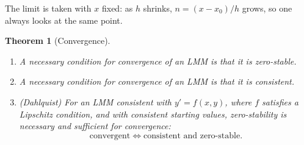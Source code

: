 \documentclass[11pt,a4paper]{article}
\numberwithin{equation}{section}
\theoremstyle{spacedplain}
\newtheorem{theorem}{Theorem}[section]
\theoremstyle{spaceddefinition}
\theoremstyle{spacedremark}
\begin{document}
The limit is taken with \(x\) fixed: as \(h\) shrinks,
\(n=(x-x_0)/h\) grows, so one always looks at the same point.

\begin{keybox}
\begin{theorem}[Convergence]\label{thm:conv-lmm}
\leavevmode
\begin{enumerate}[label=(\arabic*)]
  \item A necessary condition for convergence of an LMM is that it is
    zero-stable.
  \item A necessary condition for convergence of an LMM is that it is
    consistent.
  \item \textup{(Dahlquist)} For an LMM consistent with \(y'=f(x,y)\),
    where \(f\) satisfies a Lipschitz condition, and with consistent
    starting values, zero-stability is necessary and sufficient for
    convergence:
    \[
      \text{convergent}\iff\text{consistent and zero-stable}.
    \]
\end{enumerate}
\end{theorem}
\end{keybox}
\end{document}
